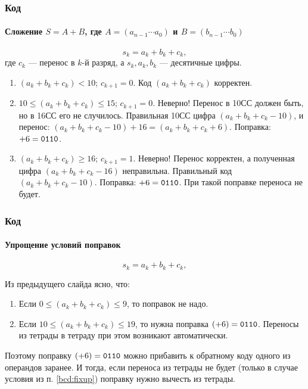 \begin{frame}
    \frametitle{Код \NaturalLabel}
    \framesubtitle{Сложение $S=A+B$, где $A=(a_{n-1}\cdots a_0)$ и $B=(b_{n-1}\cdots b_0)$}

    \[
        s_k=a_k+b_k+c_k,
    \]
    где $c_k$ --- перенос в $k$-й разряд, а $s_k,a_k,b_k$ --- десятичные цифры.
    
    \begin{enumerate}
        \item $(a_k+b_k+c_k)<10$; $c_{k+1}=0$. Код $(a_k+b_k+c_k)$ корректен.
        
        \item $10\leq (a_k+b_k+c_k)\leq 15$; $c_{k+1}=0$. Неверно! Перенос в 10СС должен быть, но в 16СС его не случилось. Правильная 10СС цифра $(a_k+b_k+c_k-10)$, и перенос: $(a_k+b_k+c_k-10)+16=(a_k+b_k+c_k+6)$. Поправка: $+6=\texttt{0110}$.
        
        \item $(a_k+b_k+c_k)\geq 16$; $c_{k+1}=1$. Неверно! Перенос корректен, а полученная цифра $(a_k+b_k+c_k-16)$ неправильна. Правильный код $(a_k+b_k+c_k-10)$. Поправка: $+6=\texttt{0110}$. При такой поправке переноса не будет.
    \end{enumerate}
\end{frame}

\begin{frame}
    \frametitle{Код \NaturalLabel}
    \framesubtitle{Упрощение условий поправок}

    \[
        s_k=a_k+b_k+c_k,
    \]
    
    Из предыдущего слайда ясно, что:
    \begin{enumerate}
        \item\label{bcd:fixup} Если $0\leq(a_k+b_k+c_k)\leq 9$, то поправок не надо.
        \item Если $10\leq(a_k+b_k+c_k)\leq 19$, то нужна поправка $(+6)=\texttt{0110}$. Переносы из тетрады в тетраду при этом возникают автоматически.
    \end{enumerate}
    
    Поэтому поправку $(+6)=\texttt{0110}$ можно прибавить к обратному коду одного из операндов заранее. И тогда, если переноса из тетрады не будет (только в случае условия из п. \ref{bcd:fixup}) поправку нужно вычесть из тетрады.
\end{frame}



